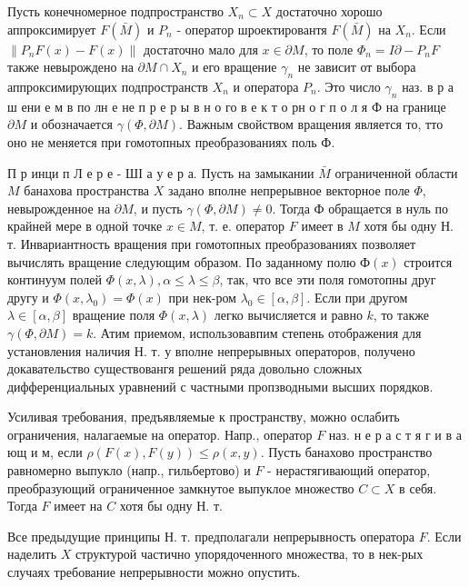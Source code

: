 \documentclass[10pt]{article}
\begin{document}
Пусть конечномерное подпространство $X_{n} \subset X$ достаточно хорошо аппроксимирует $F(\bar{M})$ и $P_{n}$ - оператор шроектировантя $F(\bar{M})$ на $X_{n}$. Если $\left\|P_{n} F(x)-F(x)\right\|$ достаточно мало для $x \in \partial M$, то поле $\Phi_{n}=I \partial-P_{n} F$ также невырождено на $\partial M \cap X_{n}$ и его вращение $\gamma_{n}$ не зависит от выбора аппроксимирующих подпространств $X_{n}$ и оператора $P_{n}$. Это число $\gamma_{n}$ наз. в р а ш ени е м в по лн е не п р е р ы в н о го в е к т о рн о г п о л я $Ф$ на границе $\partial M$ и обозначается $\mathcal{\gamma}(\Phi, \partial M)$. Важным свойством вращения является то, тто оно не меняется при гомотопных преобразованиях поль Ф.



П р инци п Л е р е - ШІ а у е р а. Пусть на замыкании $\bar{M}$ ограниченной области $M$ банахова пространства $X$ задано вполне непрерывное векторное поле $\Phi$, невырожденное на $\partial M$, и пусть $\gamma(\Phi, \partial M) \neq 0$. Тогда Ф обращается в нуль по крайней мере в одной точке $x \in M$, т. е. оператор $F$ имеет в $M$ хотя бы одну Н. т. Инвариантность вращения при гомотопных преобразованиях позволяет вычислять вращение следующим образом. По заданному полю $Ф(x)$ строится континуум полей $\Phi(x, \lambda), \alpha \leqslant \lambda \leqslant \beta$, так, что все эти поля гомотопны друг другу и $\Phi\left(x, \lambda_{0}\right)=\Phi(x)$ при нек-ром $\lambda_{0} \in[\alpha, \beta]$. Если при другом $\lambda \in[\alpha, \beta]$ вращение поля $\Phi(x, \lambda)$ легко вычисляется и равно $k$, то также $\gamma(\Phi, \partial M)=k$. Атим приемом, использовавпим степень отображения для установления наличия Н. т. у вполне непрерывных операторов, получено докавательство существовангя решений ряда довольно сложных дифференциальных уравнений с частными пропзводными высших порядков.



Усиливая требования, предъявляемые к пространству, можно ослабить ограничения, налагаемые на оператор. Напр., оператор $F$ наз. н е р а с т я г и в а ющ и м, если $\rho(F(x), F(y)) \leqslant \rho(x, y)$. Пусть банахово пространство равномерно выпукло (напр., гильбертово) и $F$ - нерастягивающий оператор, преобразующий ограниченное замкнутое выпуклое множество $C \subset X$ в себя. Тогда $F$ имеет на $C$ хотя бы одну Н. т.



Все предыдущие принципы Н. т. предполагали непрерывность оператора $F$. Если наделить $X$ структурой частично упорядоченного множества, то в нек-рых случаях требование непрерывности можно опустить.
\end{document}
